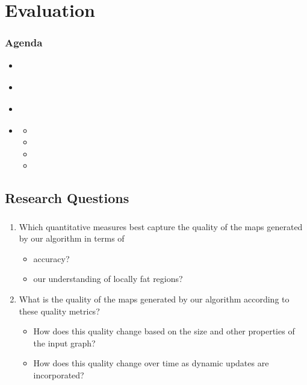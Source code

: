 \documentclass[t,18pt]{beamer}
\newcommand{\light}[1]{\textcolor{black!40}{#1}}
\begin{document}
\section{Evaluation}
\label{sect:evaluation}

\begin{frame}
  \frametitle{Agenda}
  \begin{itemize}
    \item \light{}
    \item \light{}
    \item \light{}
    \item {} \begin{itemize}
      \item {}
      \item {}
      \item {}
      \item {}
    \end{itemize}
  \end{itemize}
\end{frame}

\subsection{Research Questions}
\label{subsect:research-questions}

\begin{frame}
  \frametitle{}
  \begin{enumerate}
    \item Which quantitative measures best capture the quality of the maps generated by our algorithm in terms of \begin{itemize}
      \item accuracy?
      \item our understanding of locally fat regions?
    \end{itemize}
    \item What is the quality of the maps generated by our algorithm according to these quality metrics? \begin{itemize}
      \item How does this quality change based on the size and other properties of the input graph? 
      \item How does this quality change over time as dynamic updates are incorporated? 
    \end{itemize}
  \end{enumerate}
\end{frame}
\end{document}
